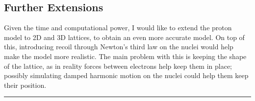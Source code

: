 \documentclass[11pt]{article}
\begin{document}
\hypertarget{further-extensions}{%
\subsection{Further Extensions}\label{further-extensions}}

Given the time and computational power, I would like to extend the
proton model to 2D and 3D lattices, to obtain an even more accurate
model. On top of this, introducing recoil through Newton's third law on
the nuclei would help make the model more realistic. The main problem
with this is keeping the shape of the lattice, as in reality forces
between electrons help keep them in place; possibly simulating damped
harmonic motion on the nuclei could help them keep their position.

\begin{center}

\rule{0.5\linewidth}{0.5pt}\end{center}



    
\end{document}
